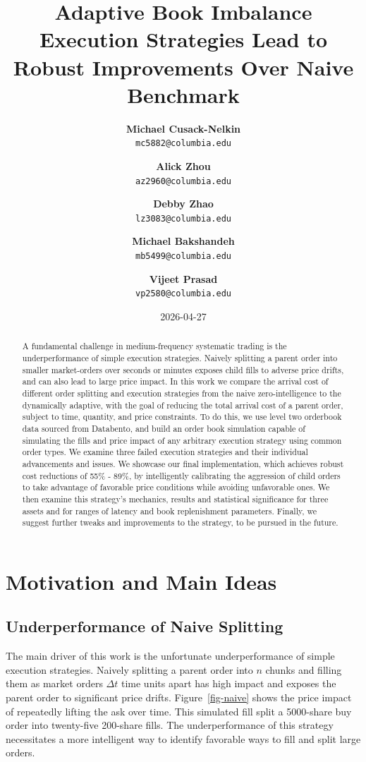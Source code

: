 \documentclass[
  letterpaper,
]{article}
\title{Adaptive Book Imbalance Execution Strategies Lead to Robust
Improvements Over Naive Benchmark}
\author{
\textbf{Michael Cusack-Nelkin}%
\\%
%
\texttt{mc5882@columbia.edu}\and 
\textbf{Alick Zhou}%
\\%
%
\texttt{az2960@columbia.edu}\and 
\textbf{Debby Zhao}%
\\%
%
\texttt{lz3083@columbia.edu}\and 
\textbf{Michael Bakshandeh}%
\\%
%
\texttt{mb5499@columbia.edu}\and 
\textbf{Vijeet Prasad}%
\\%
%
\texttt{vp2580@columbia.edu}}
\date{2026-04-27}
\begin{document}
\maketitle
\begin{abstract}
A fundamental challenge in medium-frequency systematic trading is the
underperformance of simple execution strategies. Naively splitting a
parent order into smaller market-orders over seconds or minutes exposes
child fills to adverse price drifts, and can also lead to large price
impact. In this work we compare the arrival cost of different order
splitting and execution strategies from the naive zero-intelligence to
the dynamically adaptive, with the goal of reducing the total arrival
cost of a parent order, subject to time, quantity, and price
constraints. To do this, we use level two orderbook data sourced from
Databento, and build an order book simulation capable of simulating the
fills and price impact of any arbitrary execution strategy using common
order types. We examine three failed execution strategies and their
individual advancements and issues. We showcase our final
implementation, which achieves robust cost reductions of 55\% - 89\%, by
intelligently calibrating the aggression of child orders to take
advantage of favorable price conditions while avoiding unfavorable ones.
We then examine this strategy's mechanics, results and statistical
significance for three assets and for ranges of latency and book
replenishment parameters. Finally, we suggest further tweaks and
improvements to the strategy, to be pursued in the future.
\end{abstract}


\section{Motivation and Main Ideas}\label{motivation-and-main-ideas}

\subsection{Underperformance of Naive
Splitting}\label{underperformance-of-naive-splitting}

The main driver of this work is the unfortunate underperformance of
simple execution strategies. Naively splitting a parent order into \(n\)
chunks and filling them as market orders \(\Delta t\) time units apart
has high impact and exposes the parent order to significant price
drifts. Figure~\ref{fig-naive} shows the price impact of repeatedly
lifting the ask over time. This simulated fill split a 5000-share buy
order into twenty-five 200-share fills. The underperformance of this
strategy necessitates a more intelligent way to identify favorable ways
to fill and split large orders.
\end{document}
